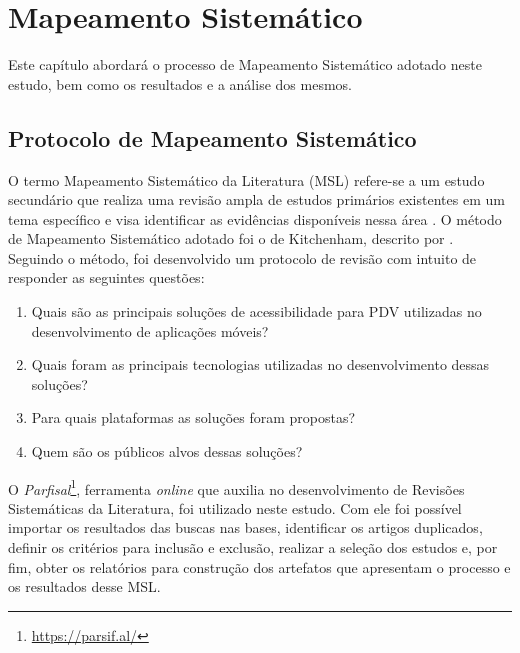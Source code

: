 \chapter{Mapeamento Sistemático}
\label{ch:mapping}

Este capítulo abordará o processo de Mapeamento Sistemático adotado neste estudo, bem como os resultados e a análise dos mesmos.

\section{Protocolo de Mapeamento Sistemático}
O termo Mapeamento Sistemático da Literatura (MSL) refere-se a um estudo secundário que realiza uma revisão ampla
de estudos primários existentes em um tema específico e visa identificar as evidências disponíveis nessa área \cite{Kitchenham2007}.
O método de Mapeamento Sistemático adotado foi o de Kitchenham, descrito por .
Seguindo o método, foi desenvolvido um protocolo de revisão com intuito de responder as seguintes questões:
\begin{enumerate}
  \item Quais são as principais soluções de acessibilidade para PDV utilizadas no desenvolvimento de aplicações móveis?
  \item Quais foram as principais tecnologias utilizadas no desenvolvimento dessas soluções?
  \item Para quais plataformas as soluções foram propostas?
  \item Quem são os públicos alvos dessas soluções?
\end{enumerate}

O \emph{Parfisal}\footnote{\url{https://parsif.al/}}, ferramenta \emph{online} que auxilia no desenvolvimento de Revisões Sistemáticas da Literatura, foi utilizado neste estudo.
Com ele foi possível importar os resultados das buscas nas bases, identificar os artigos duplicados, definir os critérios para inclusão e exclusão, realizar a seleção dos estudos e, por fim, obter os relatórios para construção dos artefatos que apresentam o processo e os resultados desse MSL.

